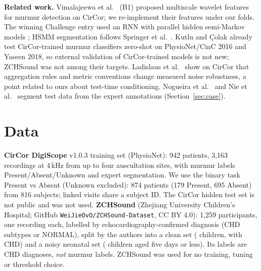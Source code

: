 \documentclass[conference]{IEEEtran}
\begin{document}
\textbf{Related work.} Vimalajeewa et al.\ \cite{vimalajeewa2025} (B1) proposed multiscale wavelet features for murmur
detection on CirCor; we re-implement their features under our folds. The winning Challenge entry used an RNN with parallel
hidden semi-Markov models \cite{mcdonald2024}; HSMM segmentation follows Springer et al.\ \cite{springer2016}. Kutlu and
\c{C}olak \cite{kutlu2026} already test CirCor-trained murmur classifiers zero-shot on PhysioNet/CinC 2016 and Yaseen 2018,
so external validation of CirCor-trained models is not new; ZCHSound \cite{jia2024} was not among their targets. Ladislaus
et al.\ \cite{ladislaus2026} show on CirCor that aggregation rules and metric conventions change measured noise robustness,
a point related to ours about test-time conditioning. Nogueira et al.\ \cite{nogueira2026} and Nie et al.\ \cite{nie2024}
segment test data from the expert annotations (Section~\ref{sec:case}).

\section{Data}
\textbf{CirCor DigiScope} v1.0.3 training set (PhysioNet): 942 patients, 3,163 recordings at 4\,kHz from up to four
auscultation sites, with murmur labels Present/Absent/Unknown and expert segmentation. We use the binary task Present vs
Absent (Unknown excluded): 874 patients (179 Present, 695 Absent) from 816 subjects; linked visits share a subject ID.
The CirCor hidden test set is not public and was not used.
\textbf{ZCHSound} \cite{jia2024} (Zhejiang University Children's Hospital; GitHub \texttt{WeiJieOvO/ZCHSound-Dataset},
CC BY 4.0): 1,259 participants, one recording each, labelled by echocardiography-confirmed diagnosis (CHD subtypes or
NORMAL), split by the authors into a clean set ( children,  with CHD) and a noisy neonatal
set ( children aged five days or less). Its labels are CHD diagnoses, \emph{not} murmur labels. ZCHSound was
used for no training, tuning or threshold choice.
\end{document}
